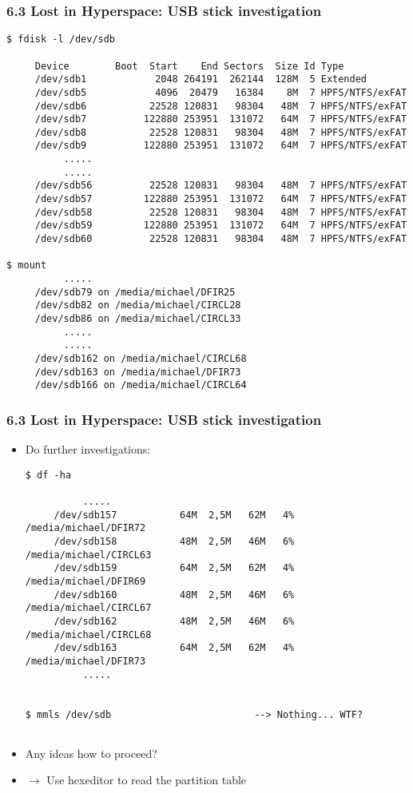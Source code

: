 \begin{frame}[fragile]
    \frametitle{6.3 Lost in Hyperspace: USB stick investigation}
  \begin{lstlisting}[basicstyle=\tiny]
$ fdisk -l /dev/sdb

     Device        Boot  Start    End Sectors  Size Id Type
     /dev/sdb1            2048 264191  262144  128M  5 Extended
     /dev/sdb5            4096  20479   16384    8M  7 HPFS/NTFS/exFAT
     /dev/sdb6           22528 120831   98304   48M  7 HPFS/NTFS/exFAT
     /dev/sdb7          122880 253951  131072   64M  7 HPFS/NTFS/exFAT
     /dev/sdb8           22528 120831   98304   48M  7 HPFS/NTFS/exFAT
     /dev/sdb9          122880 253951  131072   64M  7 HPFS/NTFS/exFAT
          .....
          .....
     /dev/sdb56          22528 120831   98304   48M  7 HPFS/NTFS/exFAT
     /dev/sdb57         122880 253951  131072   64M  7 HPFS/NTFS/exFAT
     /dev/sdb58          22528 120831   98304   48M  7 HPFS/NTFS/exFAT
     /dev/sdb59         122880 253951  131072   64M  7 HPFS/NTFS/exFAT
     /dev/sdb60          22528 120831   98304   48M  7 HPFS/NTFS/exFAT

$ mount
          .....
     /dev/sdb79 on /media/michael/DFIR25
     /dev/sdb82 on /media/michael/CIRCL28
     /dev/sdb86 on /media/michael/CIRCL33 
          .....
          .....
     /dev/sdb162 on /media/michael/CIRCL68
     /dev/sdb163 on /media/michael/DFIR73
     /dev/sdb166 on /media/michael/CIRCL64
  \end{lstlisting}
\end{frame}


\begin{frame}[fragile]
    \frametitle{6.3 Lost in Hyperspace: USB stick investigation}
    \begin{itemize}
	    \item[] Do further investigations:
  \begin{lstlisting}[basicstyle=\tiny]
$ df -ha

          .....
     /dev/sdb157           64M  2,5M   62M   4% /media/michael/DFIR72
     /dev/sdb158           48M  2,5M   46M   6% /media/michael/CIRCL63
     /dev/sdb159           64M  2,5M   62M   4% /media/michael/DFIR69
     /dev/sdb160           48M  2,5M   46M   6% /media/michael/CIRCL67
     /dev/sdb162           48M  2,5M   46M   6% /media/michael/CIRCL68
     /dev/sdb163           64M  2,5M   62M   4% /media/michael/DFIR73
          .....


$ mmls /dev/sdb                         --> Nothing... WTF?


  \end{lstlisting}
	    \item[] Any ideas how to proceed?
	    \item[] $\to$ Use hexeditor to read the partition table
    \end{itemize}
\end{frame}



